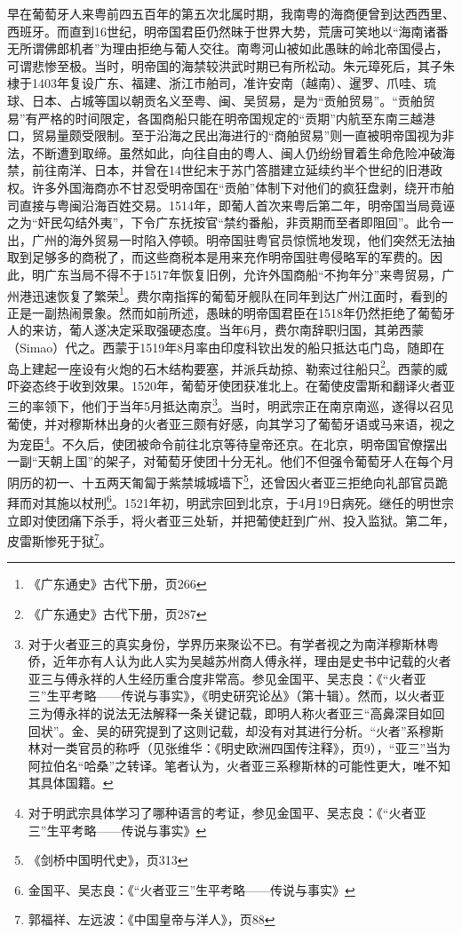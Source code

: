 早在葡萄牙人来粤前四五百年的第五次北属时期，我南粤的海商便曾到达西西里、西班牙。而直到16世纪，明帝国君臣仍然昧于世界大势，荒唐可笑地以“海南诸番无所谓佛郎机者”为理由拒绝与葡人交往。南粤河山被如此愚昧的岭北帝国侵占，可谓悲惨至极。当时，明帝国的海禁较洪武时期已有所松动。朱元璋死后，其子朱棣于1403年复设广东、福建、浙江市舶司，准许安南（越南）、暹罗、爪哇、琉球、日本、占城等国以朝贡名义至粤、闽、吴贸易，是为“贡舶贸易”。“贡舶贸易”有严格的时间限定，各国商船只能在明帝国规定的“贡期”内航至东南三越港口，贸易量颇受限制。至于沿海之民出海进行的“商舶贸易”则一直被明帝国视为非法，不断遭到取缔。虽然如此，向往自由的粤人、闽人仍纷纷冒着生命危险冲破海禁，前往南洋、日本，并曾在14世纪末于苏门答腊建立延续约半个世纪的旧港政权。许多外国海商亦不甘忍受明帝国在“贡舶”体制下对他们的疯狂盘剥，绕开市舶司直接与粤闽沿海百姓交易。1514年，即葡人首次来粤后第二年，明帝国当局竟诬之为“奸民勾结外夷”，下令广东抚按官“禁约番船，非贡期而至者即阻回”。此令一出，广州的海外贸易一时陷入停顿。明帝国驻粤官员惊慌地发现，他们突然无法抽取到足够多的商税了，而这些商税本是用来充作明帝国驻粤侵略军的军费的。因此，明广东当局不得不于1517年恢复旧例，允许外国商船“不拘年分”来粤贸易，广州港迅速恢复了繁荣\footnote{《广东通史》古代下册，页266}。费尔南指挥的葡萄牙舰队在同年到达广州江面时，看到的正是一副热闹景象。然而如前所述，愚昧的明帝国君臣在1518年仍然拒绝了葡萄牙人的来访，葡人遂决定采取强硬态度。当年6月，费尔南辞职归国，其弟西蒙（Simao）代之。西蒙于1519年8月率由印度科钦出发的船只抵达屯门岛，随即在岛上建起一座设有火炮的石木结构要塞，并派兵劫掠、勒索过往船只\footnote{《广东通史》古代下册，页287}。西蒙的威吓姿态终于收到效果。1520年，葡萄牙使团获准北上。在葡使皮雷斯和翻译火者亚三的率领下，他们于当年5月抵达南京\footnote{对于火者亚三的真实身份，学界历来聚讼不已。有学者视之为南洋穆斯林粤侨，近年亦有人认为此人实为吴越苏州商人傅永祥，理由是史书中记载的火者亚三与傅永祥的人生经历重合度非常高。参见金国平、吴志良：《“火者亚三”生平考略——传说与事实》，《明史研究论丛》（第十辑）。然而，以火者亚三为傅永祥的说法无法解释一条关键记载，即明人称火者亚三“高鼻深目如回回状”。金、吴的研究提到了这则记载，却没有对其进行分析。“火者”系穆斯林对一类官员的称呼（见张维华：《明史欧洲四国传注释》，页9），“亚三”当为阿拉伯名“哈桑”之转译。笔者认为，火者亚三系穆斯林的可能性更大，唯不知其具体国籍。}。当时，明武宗正在南京南巡，遂得以召见葡使，并对穆斯林出身的火者亚三颇有好感，向其学习了葡萄牙语或马来语，视之为宠臣\footnote{对于明武宗具体学习了哪种语言的考证，参见金国平、吴志良：《“火者亚三”生平考略——传说与事实》}。不久后，使团被命令前往北京等待皇帝还京。在北京，明帝国官僚摆出一副“天朝上国”的架子，对葡萄牙使团十分无礼。他们不但强令葡萄牙人在每个月阴历的初一、十五两天匍匐于紫禁城城墙下\footnote{《剑桥中国明代史》，页313}，还曾因火者亚三拒绝向礼部官员跪拜而对其施以杖刑\footnote{金国平、吴志良：《“火者亚三”生平考略——传说与事实》}。1521年初，明武宗回到北京，于4月19日病死。继任的明世宗立即对使团痛下杀手，将火者亚三处斩，并把葡使赶到广州、投入监狱。第二年，皮雷斯惨死于狱\footnote{郭福祥、左远波：《中国皇帝与洋人》，页88}。


